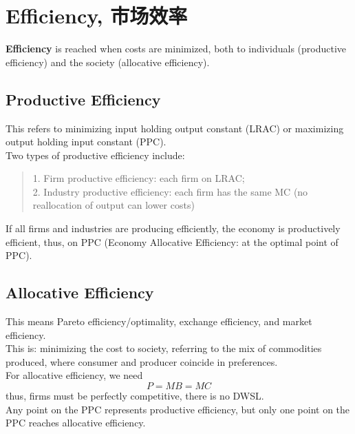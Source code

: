 \section{Efficiency, 市场效率}
\textbf{Efficiency} is reached when costs are minimized, both to individuals (productive efficiency) and the society (allocative efficiency).

\subsection{Productive Efficiency}
This refers to minimizing input holding output constant (LRAC) or maximizing output holding input constant (PPC). \\
Two types of productive efficiency include:
\begin{quote}
    1. Firm productive efficiency: each firm on LRAC; \\
    2. Industry productive efficiency: each firm has the same MC (no reallocation of output can lower costs)
\end{quote}
If all firms and industries are producing efficiently, the economy is productively efficient, thus, on PPC (Economy Allocative Efficiency: at the optimal point of PPC).

\subsection{Allocative Efficiency}
This means Pareto efficiency/optimality, exchange efficiency, and market efficiency. \\
This is: minimizing the cost to society, referring to the mix of commodities produced, where consumer and producer coincide in preferences. \\
For allocative efficiency, we need
$$P = MB = MC$$
thus, firms must be perfectly competitive, there is no DWSL. \\
Any point on the PPC represents productive efficiency, but only one point on the PPC reaches allocative efficiency.

